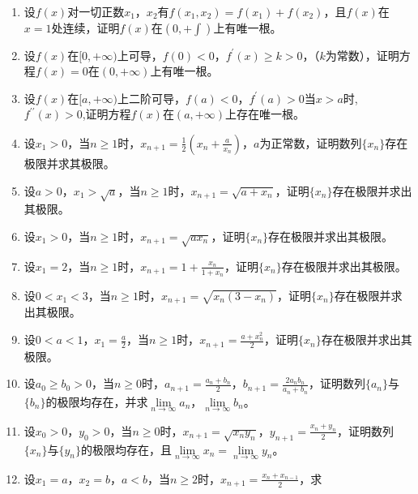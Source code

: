 \begin{enumerate}[{例}1.]
    \item 设$f(x)$对一切正数$x_1$，$x_2$有$f(x_1,x_2)=f(x_1)+f(x_2)$，且$f(x)$在$x=1$处连续，证明$f(x)$在$(0,+\int)$上有唯一根。
    \item 设$f(x)$在$[0,+\infty)$上可导，$f(0)<0$，$f^{\prime}(x)\geq k>0$，（$k$为常数），证明方程$f(x)=0$在$(0,+\infty)$上有唯一根。
    \item 设$f(x)$在$[a,+\infty)$上二阶可导，$f(a)<0$，$f^\prime(a)>0$当$x>a$时,$f^{\prime\prime}(x)>0$,证明方程$f(x)$在$(a,+\infty)$上存在唯一根。
    \item 设$x_1>0$，当$n\geq1$时，$x_{n+1}=\frac{1}{2}(x_n+\frac{a}{x_n})$，$a$为正常数，证明数列$\{x_n\}$存在极限并求其极限。
    \item 设$a>0$，$x_1>\sqrt{a}$，当$n\geq1$时，$x_{n+1}=\sqrt{a+x_n}$，证明$\{x_n\}$存在极限并求出其极限。
    \item 设$x_1>0$，当$n\geq1$时，$x_{n+1}=\sqrt{a x_n}$，证明$\{x_n\}$存在极限并求出其极限。
    \item 设$x_1=2$，当$n\geq1$时，$x_{n+1}=1+\frac{x_n}{1+x_n}$，证明$\{x_n\}$存在极限并求出其极限。
    \item 设$0<x_1<3$，当$n\geq1$时，$x_{n+1}=\sqrt{x_n(3-x_n)}$，证明$\{x_n\}$存在极限并求出其极限。
    \item 设$0<a<1$，$x_1 =\frac{a}{2}$，当$n\geq1$时，$x_{n+1}=\frac{a+x_n^2}{2}$，证明$\{x_n\}$存在极限并求出其极限。
    \item 设$a_0\geq b_0>0$，当$n\geq 0$时，$a_{n+1}=\frac{a_n+b_n}{2}$，$b_{n+1}=\frac{2 a_n b_n}{a_n + b_n}$，证明数列$\{a_n\}$与$\{b_n\}$的极限均存在，并求$\lim\limits_{n\to \infty}a_n$，$\lim\limits_{n \to \infty}b_n$。
    \item 设$x_0>0$，$y_0>0$，当$n\geq 0$时，$x_{n+1}=\sqrt{x_n y_n}$，$y_{n+1}=\frac{x_n + y_n}{2}$，证明数列$\{x_n\}$与$\{y_n\}$的极限均存在，且$\lim\limits_{n\to \infty}x_n=\lim\limits_{n \to \infty}y_n$。
    \item 设$x_1=a$，$x_2=b$，$a<b$，当$n\geq 2$时，$x_{n+1}=\frac{x_n +x_{n-1}}{2}$，求

\end{enumerate}
